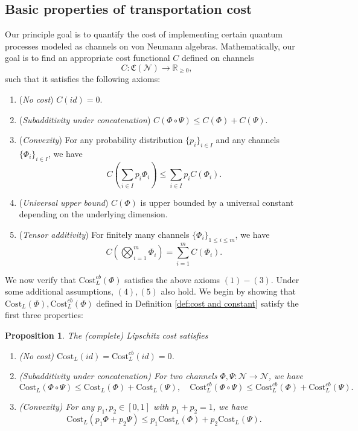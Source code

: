 \documentclass[11pt,reqno]{amsart}
\numberwithin{equation}{section}
\newtheorem{prop}[lemma]{Proposition}
\newcommand{\mb}{\mathbb}
\newcommand{\mc}{\mathcal}
\newcommand{\Cost}{\mathrm{Cost}}
\begin{document}
\subsection{Basic properties of transportation cost}\label{sec: basic cost}
Our principle goal is to quantify the cost of implementing certain quantum processes modeled as channels on von Neumann algebras. %
Mathematically, our goal is to find an appropriate cost functional $C$ defined on channels $$C: \mathfrak{C}(\mc N)\to \mb R_{\ge 0},$$
such that it satisfies the following axioms:
\begin{enumerate}
\item (\textit{No cost}) $C(id) = 0$.
\item (\textit{Subadditivity under concatenation}) $C(\Phi \circ \Psi) \le C(\Phi)+C(\Psi)$. 
\item (\textit{Convexity}) For any probability distribution $\{p_i\}_{i\in I}$ and any channels $\{\Phi_i\}_{i \in I}$, we have 
\begin{equation}
C(\sum_{i\in I} p_i\Phi_i) \le \sum_{i\in I} p_iC(\Phi_i).
\end{equation} 
\item (\textit{Universal upper bound}) $C(\Phi)$ is upper bounded by a universal constant depending on the underlying dimension.
\item (\textit{Tensor additivity}) For finitely many channels $\{\Phi_i\}_{1\le i \le m}$, we have 
\begin{equation}
C(\bigotimes_{i=1}^m \Phi_i) = \sum_{i=1}^m C(\Phi_i).
\end{equation}
\end{enumerate}	
We now verify that $\mathrm{Cost}^{cb}_L(\Phi)$ satisfies the above axioms $(1)-(3)$. Under some additional assumptions, $(4),(5)$ also hold. We begin by showing that $\mathrm{Cost}_L(\Phi), \mathrm{Cost}^{cb}_L(\Phi)$ defined in Definition \ref{def:cost and constant} satisfy the first three properties:
\begin{prop}\label{main:elementary property}
The (complete) Lipschitz cost satisfies
\begin{enumerate}
\item \label{cost: no cost} (\textit{No cost}) $\Cost_{L}(id) = \Cost^{cb}_{L}(id) = 0$.
\item \label{cost: subadditivity}(\textit{Subadditivity under concatenation}) For two channels $\Phi,\Psi: \mc N \to \mc N$, we have 
\begin{equation}
    \Cost_{L}(\Phi \circ \Psi) \le \Cost_{L}(\Phi) + \Cost_{L}(\Psi),\quad  \Cost^{cb}_{L}(\Phi \circ \Psi) \le \Cost^{cb}_{L}(\Phi) + \Cost^{cb}_{L}(\Psi).
\end{equation}
\item \label{cost: convexity} (\textit{Convexity}) For any $p_1,p_2 \in [0,1]$ with $p_1 + p_2 = 1$, we have 
\begin{equation}
 \Cost_{L}(p_1 \Phi + p_2 \Psi) \le p_1  \Cost_{L}(\Phi) + p_2  \Cost_{L}(\Psi).
\end{equation} 
\end{enumerate}
\end{prop}
\end{document}
